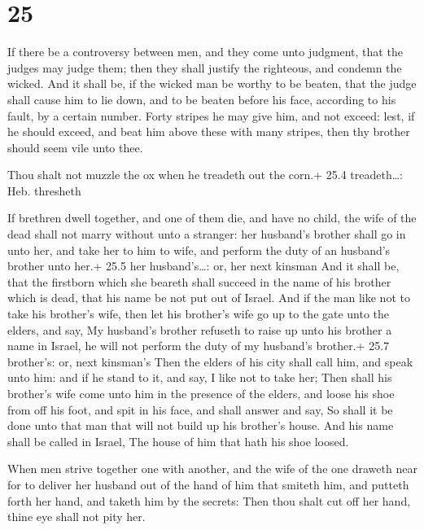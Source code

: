 \hypertarget{section-24}{%
\section{25}\label{section-24}}

 If there be a controversy between men, and they come unto
judgment, that the judges may judge them; then they shall justify the
righteous, and condemn the wicked.  And it shall be, if the
wicked man be worthy to be beaten, that the judge shall cause him to lie
down, and to be beaten before his face, according to his fault, by a
certain number.  Forty stripes he may give him, and not
exceed: lest, if he should exceed, and beat him above these with many
stripes, then thy brother should seem vile unto thee.

 Thou shalt not muzzle the ox when he treadeth out the
corn.+ 25.4 treadeth\ldots: Heb. thresheth

 If brethren dwell together, and one of them die, and have
no child, the wife of the dead shall not marry without unto a stranger:
her husband's brother shall go in unto her, and take her to him to wife,
and perform the duty of an husband's brother unto her.+ 25.5 her
husband's\ldots: or, her next kinsman  And it shall be, that
the firstborn which she beareth shall succeed in the name of his brother
which is dead, that his name be not put out of Israel.  And
if the man like not to take his brother's wife, then let his brother's
wife go up to the gate unto the elders, and say, My husband's brother
refuseth to raise up unto his brother a name in Israel, he will not
perform the duty of my husband's brother.+ 25.7 brother's: or, next
kinsman's  Then the elders of his city shall call him, and
speak unto him: and if he stand to it, and say, I like not to take her;
 Then shall his brother's wife come unto him in the presence
of the elders, and loose his shoe from off his foot, and spit in his
face, and shall answer and say, So shall it be done unto that man that
will not build up his brother's house.  And his name shall
be called in Israel, The house of him that hath his shoe loosed.

 When men strive together one with another, and the wife
of the one draweth near for to deliver her husband out of the hand of
him that smiteth him, and putteth forth her hand, and taketh him by the
secrets:  Then thou shalt cut off her hand, thine eye shall
not pity her.

